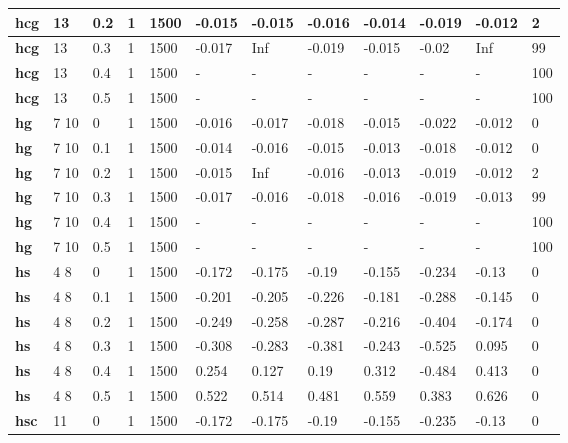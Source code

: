 \begin{longtable}[h]{|p{0.8cm}|p{1.5cm}|p{1cm}|p{1cm}|p{1cm}|p{1cm}|p{1cm}|p{1cm}|p{1cm}|p{1cm}|p{1cm}|p{1.5cm}|}
    \\ \hline
  \textbf{hcg } &  13         & 0.2 & 1 & 1500 & -0.015 & -0.015 & -0.016 & -0.014 & -0.019 & -0.012 &   2
    \\ \hline
  \textbf{hcg } &  13         & 0.3 & 1 & 1500 & -0.017 &    Inf & -0.019 & -0.015 &  -0.02 &    Inf &  99
    \\ \hline
  \textbf{hcg } &  13         & 0.4 & 1 & 1500 & - & - & - & - & - & - & 100
    \\ \hline
  \textbf{hcg } &  13         & 0.5 & 1 & 1500 & - & - & - & - & - & - & 100
    \\ \hline
  \textbf{hg  } &  7 10       &   0 & 1 & 1500 & -0.016 & -0.017 & -0.018 & -0.015 & -0.022 & -0.012 &   0
    \\ \hline
  \textbf{hg  } &  7 10       & 0.1 & 1 & 1500 & -0.014 & -0.016 & -0.015 & -0.013 & -0.018 & -0.012 &   0
    \\ \hline
  \textbf{hg  } &  7 10       & 0.2 & 1 & 1500 & -0.015 &    Inf & -0.016 & -0.013 & -0.019 & -0.012 &   2
    \\ \hline
  \textbf{hg  } &  7 10       & 0.3 & 1 & 1500 & -0.017 & -0.016 & -0.018 & -0.016 & -0.019 & -0.013 &  99
    \\ \hline
  \textbf{hg  } &  7 10       & 0.4 & 1 & 1500 & - & - & - & - & - & - & 100
    \\ \hline
  \textbf{hg  } &  7 10       & 0.5 & 1 & 1500 & - & - & - & - & - & - & 100
    \\ \hline
  \textbf{hs  } &  4 8        &   0 & 1 & 1500 & -0.172 & -0.175 &  -0.19 & -0.155 & -0.234 &  -0.13 &   0
    \\ \hline
  \textbf{hs  } &  4 8        & 0.1 & 1 & 1500 & -0.201 & -0.205 & -0.226 & -0.181 & -0.288 & -0.145 &   0
    \\ \hline
  \textbf{hs  } &  4 8        & 0.2 & 1 & 1500 & -0.249 & -0.258 & -0.287 & -0.216 & -0.404 & -0.174 &   0
    \\ \hline
  \textbf{hs  } &  4 8        & 0.3 & 1 & 1500 & -0.308 & -0.283 & -0.381 & -0.243 & -0.525 &  0.095 &   0
    \\ \hline
  \textbf{hs  } &  4 8        & 0.4 & 1 & 1500 &  0.254 &  0.127 &   0.19 &  0.312 & -0.484 &  0.413 &   0
    \\ \hline
  \textbf{hs  } &  4 8        & 0.5 & 1 & 1500 &  0.522 &  0.514 &  0.481 &  0.559 &  0.383 &  0.626 &   0
    \\ \hline
  \textbf{hsc } &  11         &   0 & 1 & 1500 & -0.172 & -0.175 &  -0.19 & -0.155 & -0.235 &  -0.13 &   0

\end{longtable}
